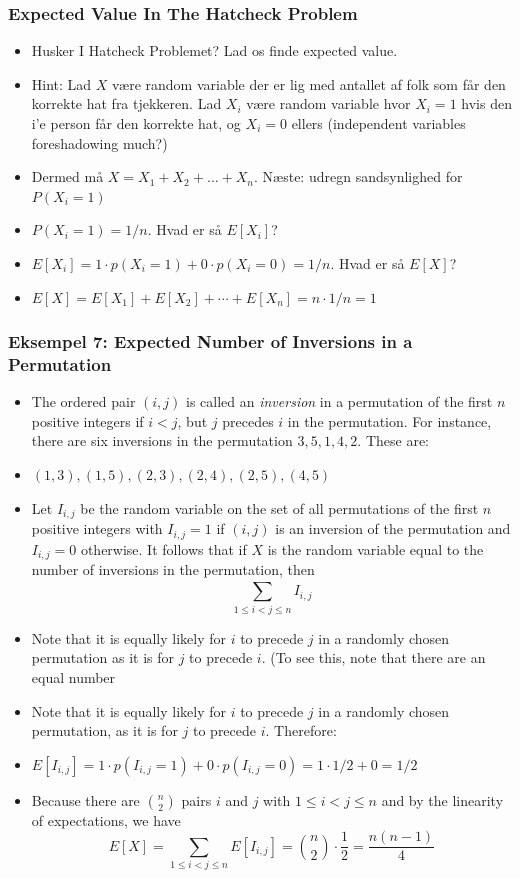 \documentclass{beamer}
\begin{document}
\begin{frame}
  \frametitle{Expected Value In The Hatcheck Problem}
  \begin{itemize}
  \item<1-> Husker I Hatcheck Problemet? Lad os finde expected value.
  \item<1-> Hint: Lad $X$ være random variable der er lig med antallet af folk som får den korrekte hat fra tjekkeren. Lad $X_{i}$ være random variable hvor $X_{i} = 1$ hvis den i'e person får den korrekte hat, og $X_{i}=0$ ellers (independent variables foreshadowing much?)
  \item<1-> Dermed må $X = X_1+ X_{2}+ \ldots+ X_{n}$. Næste: udregn sandsynlighed for $P(X_{i}=1)$
  \item<2-> $P(X_{i}=1) = 1/n$. Hvad er så $E[X_{i}]$?
  \item<3-> $E[X_{i}] = 1 \cdot p(X_{i}=1) + 0 \cdot p(X_{i}=0) = 1/n$. Hvad er så $E[X]$?
  \item<4-> $E[X] = E[X_{1}] + E[X_{2}]+ \cdots + E[X_{n}] = n \cdot 1/n = 1$
  \end{itemize}
\end{frame}


\begin{frame}[allowframebreaks]
  \frametitle{Eksempel 7: Expected Number of Inversions in a Permutation}
  \begin{itemize}
  \item The ordered pair $(i,j)$ is called an \textit{inversion} in a permutation of the first $n$ positive integers if $i < j$, but $j$ precedes $i$ in the permutation. For instance, there are six inversions in the permutation $3,5,1,4,2$. These are:
  \item $(1,3),(1,5),(2,3),(2,4),(2,5),(4,5)$
  \item Let $I_{i,j}$ be the random variable on the set of all permutations of the first $n$ positive integers with $I_{i,j} = 1$ if $(i,j)$ is an inversion of the permutation and $I_{i,j} = 0$ otherwise. It follows that if $X$ is the random variable equal to the number of inversions in the permutation, then \[\sum_{1 \leq i < j \leq n}^{} I_{i,j}  \]
  \item Note that it is equally likely for $i$ to precede $j$ in a randomly chosen permutation as it is for $j$ to precede $i$. (To see this, note that there are an equal number
  \item Note that it is equally likely for $i$ to precede $j$ in a randomly chosen permutation, as it is for $j$ to precede $i$. Therefore:
  \item $E[I_{i,j}] = 1 \cdot p(I_{i,j}=1)+0 \cdot p(I_{i,j}=0)=1 \cdot 1/2 + 0 = 1/2$
  \item Because there are $\binom{n}{2}$ pairs $i$ and $j$ with $1 \leq i < j \leq n$ and by the linearity of expectations, we have \[ E[X] = \sum_{1 \leq i < j \leq n}^{} E[I_{i,j}] = \binom{n}{2} \cdot \frac{1}{2} = \frac{n(n-1)}{4} \]
  \end{itemize}
\end{frame}
\end{document}
